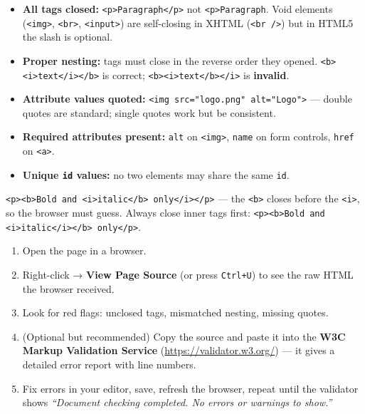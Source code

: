\documentclass[11pt]{article}
\begin{document}
\begin{aretenir}
\begin{itemize}
  \item \textbf{All tags closed:} \texttt{<p>Paragraph</p>} not \texttt{<p>Paragraph}.  Void elements (\texttt{<img>}, \texttt{<br>}, \texttt{<input>}) are self-closing in XHTML (\texttt{<br />}) but in HTML5 the slash is optional.
  \item \textbf{Proper nesting:} tags must close in the reverse order they opened.  \texttt{<b><i>text</i></b>} is correct; \texttt{<b><i>text</b></i>} is \textbf{invalid}.
  \item \textbf{Attribute values quoted:} \texttt{<img src="logo.png" alt="Logo">} — double quotes are standard; single quotes work but be consistent.
  \item \textbf{Required attributes present:} \texttt{alt} on \texttt{<img>}, \texttt{name} on form controls, \texttt{href} on \texttt{<a>}.
  \item \textbf{Unique \texttt{id} values:} no two elements may share the same \texttt{id}.
\end{itemize}
\end{aretenir}

\begin{attention}
\texttt{<p><b>Bold and <i>italic</b> only</i></p>} — the \texttt{<b>} closes before the \texttt{<i>}, so the browser must guess.  Always close inner tags first: \texttt{<p><b>Bold and <i>italic</i></b> only</p>}.
\end{attention}

\begin{methode}
\begin{enumerate}
  \item Open the page in a browser.
  \item Right-click → \textbf{View Page Source} (or press \texttt{Ctrl+U}) to see the raw HTML the browser received.
  \item Look for red flags: unclosed tags, mismatched nesting, missing quotes.
  \item (Optional but recommended) Copy the source and paste it into the \textbf{W3C Markup Validation Service} (\url{https://validator.w3.org/}) — it gives a detailed error report with line numbers.
  \item Fix errors in your editor, save, refresh the browser, repeat until the validator shows \emph{“Document checking completed. No errors or warnings to show.”}
\end{enumerate}
\end{methode}
\end{document}
